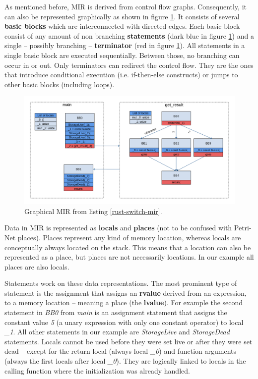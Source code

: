 As mentioned before, MIR is derived from control flow graphs\cite[chapter 2.17]{rustc-guide}.
Consequently, it can also be represented graphically as shown in figure \ref{switch-mir-graph}.
It consists of several \textbf{basic blocks} which are interconnected with directed edges.
Each basic block consist of any amount of non branching \textbf{statements} (dark blue in figure \ref{switch-mir-graph}) and a single -- possibly branching -- \textbf{terminator} (red in figure \ref{switch-mir-graph}).
All statements in a single basic block are executed sequentially.
Between those, no branching can occur in or out.
Only terminators can redirect the control flow.
They are the ones that introduce conditional execution (i.e. if-then-else constructs) or jumps to other basic blocks (including loops).

\begin{figure}
    \centering
    \includegraphics[width=\textwidth]{../diagrams/SwitchInt.png}
    \caption{
        Graphical MIR from listing \ref{rust-switch-mir}.
        }
    \label{switch-mir-graph}
\end{figure}

Data in MIR is represented as \textbf{locals} and \textbf{places} (not to be confused with Petri-Net places).
Places represent any kind of memory location, whereas locals are conceptually always located on the stack.
This means that a location can also be represented as a place, but places are not necessarily locations.
In our example all places are also locals.

Statements work on these data representations.
The most prominent type of statement is the assignment that assigns an \textbf{rvalue} derived from an expression, to a memory location -- meaning a place (the \textbf{lvalue}).
For example the second statement in \textit{BB0} from \textit{main} is an assignment statement that assigns the constant value \textit{5} (a unary expression with only one constant operator) to local \textit{\_1}.
All other statements in our example are \textit{StorageLive} and \textit{StorageDead} statements.
Locals cannot be used before they were set live or after they were set dead -- except for the return local (always local \textit{\_0}) and function arguments (always the first locals after local \textit{\_0}).
They are logically linked to locals in the calling function where the initialization was already handled.

